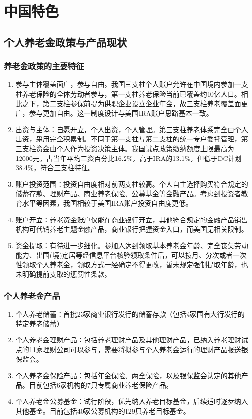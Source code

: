 \documentclass[a4paper,zihao=5]{ctexbeamer}
\begin{document}
\section{中国特色}
\subsection{个人养老金政策与产品现状}
\begin{frame}
    \frametitle{养老金政策的主要特征}
    \begin{enumerate}
        \item 参与主体覆盖面广，参与自由。我国三支柱个人账户允许在中国境内参加一支柱养老保险的全体劳动者参与，第一支柱养老保险当前已覆盖约10亿人口。相比之下，第二支柱参保前提为供职企业设立企业年金，故三支柱养老覆盖面更广，参与更加自由。这一制度设计与美国IRA账户思路基本一致。
        \item 出资与主体：自愿开立，个人出资，个人管理。第三支柱养老体系完全由个人出资，采用完全积累制。不同于第一支柱与第二支柱的统一专户委托管理，第三支柱资金由个人作为投资决策主体。我国试点政策缴纳额度上限最高为12000元，占当年平均工资百分比16.2\%，高于IRA的13.1\%，但低于DC计划38.4\%，符合三支柱特征。
        \item 账户投资范围：投资自由度相对前两支柱较高。个人自主选择购买符合规定的储蓄存款、理财产品、商业养老保险、公募基金等金融产品。考虑到投资者教育水平等因素，我国相较于美国IRA账户投资自由度更低。
        \item 账户开立：养老资金账户仅能在商业银行开立，其他符合规定的金融产品销售机构可代销养老主题金融产品，商业银行把握资金入口，而美国无相关限制。
        \item 资金提取：有待进一步细化。参加人达到领取基本养老金年龄、完全丧失劳动能力、出国(境)定居等经信息平台核验领取条件后，可以按月、分次或者一次性领取个人养老金，领取方式一经确定不得更改，暂未规定强制提取年龄，也未明确提前支取的惩罚性条款。
    \end{enumerate}
\end{frame}

\begin{frame}
    \frametitle{个人养老金产品}

    \begin{enumerate}
        \item 个人养老储蓄：首批23家商业银行发行的储蓄存款（包括4家国有大行发行的特定养老储蓄）
        \item 个人养老金理财产品：包括养老理财产品及其他理财产品，已纳入养老理财试点的11家理财公司可以参与，需要将拟参与个人养老金运行的理财产品报送银保监会。
        \item 个人养老金保险产品：包括年金保险、两全保险，以及银保监会认定的其他产品。目前包括6家机构的7只专属商业养老保险产品。
        \item 个人养老金公募基金：试行阶段，优先纳入养老目标基金，后续适时逐步纳入其他基金。目前包括40家公募机构的129只养老目标基金。
    \end{enumerate}

\end{frame}
\end{document}
